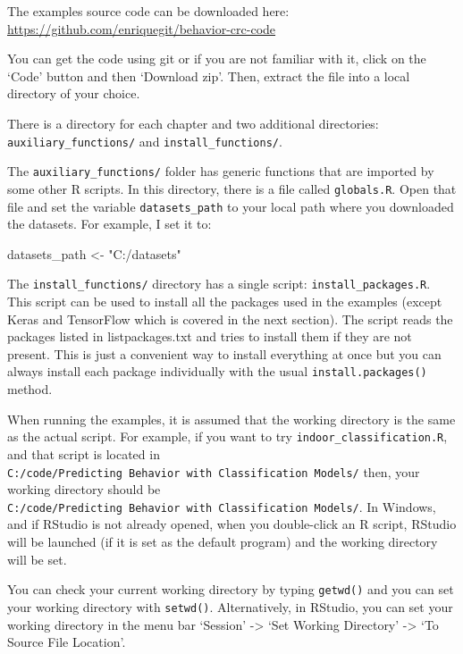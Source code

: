 \documentclass[
  11pt,
]{krantz}
\newenvironment{Shaded}{\begin{snugshade}}{\end{snugshade}}
\newcommand{\NormalTok}[1]{#1}
\newcommand{\OtherTok}[1]{\textcolor[rgb]{0.37,0.37,0.37}{#1}}
\newcommand{\StringTok}[1]{\textcolor[rgb]{0.5,0.5,0.5}{#1}}
\begin{document}
The examples source code can be downloaded here: \url{https://github.com/enriquegit/behavior-crc-code}

You can get the code using git or if you are not familiar with it, click on the `Code' button and then `Download zip'. Then, extract the file into a local directory of your choice.

There is a directory for each chapter and two additional directories: \texttt{auxiliary\_functions/} and \texttt{install\_functions/}.

The \texttt{auxiliary\_functions/} folder has generic functions that are imported by some other R scripts. In this directory, there is a file called \texttt{globals.R}. Open that file and set the variable \texttt{datasets\_path} to your local path where you downloaded the datasets. For example, I set it to:

\begin{Shaded}
\begin{Highlighting}[]
\NormalTok{datasets\_path }\OtherTok{\textless{}{-}} \StringTok{"C:/datasets"}
\end{Highlighting}
\end{Shaded}

The \texttt{install\_functions/} directory has a single script: \texttt{install\_packages.R}. This script can be used to install all the packages used in the examples (except Keras and TensorFlow which is covered in the next section). The script reads the packages listed in listpackages.txt and tries to install them if they are not present. This is just a convenient way to install everything at once but you can always install each package individually with the usual \texttt{install.packages()} method.

When running the examples, it is assumed that the working directory is the same as the actual script. For example, if you want to try \texttt{indoor\_classification.R}, and that script is located in \texttt{C:/code/Predicting\ Behavior\ with\ Classification\ Models/} then, your working directory should be \texttt{C:/code/Predicting\ Behavior\ with\ Classification\ Models/}. In Windows, and if RStudio is not already opened, when you double-click an R script, RStudio will be launched (if it is set as the default program) and the working directory will be set.

You can check your current working directory by typing \texttt{getwd()} and you can set your working directory with \texttt{setwd()}. Alternatively, in RStudio, you can set your working directory in the menu bar `Session' -\textgreater{} `Set Working Directory' -\textgreater{} `To Source File Location'.
\end{document}
